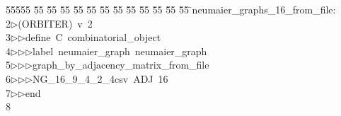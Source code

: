 %
%
\begin{tabbing}
55555 \= 55 \= 55 \= 55 \= 55 \= 55 \= 55 \= 55 \= 55 \= 55 \= 55 \= 55 \= 55 \= \>neumaier\_graphs\_16\_from\_file:\\[0pt]
2\>$\triangleright$\>(ORBITER)\ v\ 2\ \\[0pt]
3\>$\triangleright$\>$\triangleright$\>define\ C\ combinatorial\_object\ \\[0pt]
4\>$\triangleright$\>$\triangleright$\>$\triangleright$\>label\ neumaier\_graph\ neumaier\_graph\ \\[0pt]
5\>$\triangleright$\>$\triangleright$\>$\triangleright$\>graph\_by\_adjacency\_matrix\_from\_file\ \\[0pt]
6\>$\triangleright$\>$\triangleright$\>$\triangleright$\>NG\_16\_9\_4\_2\_4csv\ ADJ\ 16\ \\[0pt]
7\>$\triangleright$\>$\triangleright$\>end\\[0pt]
8\>\end{tabbing}
